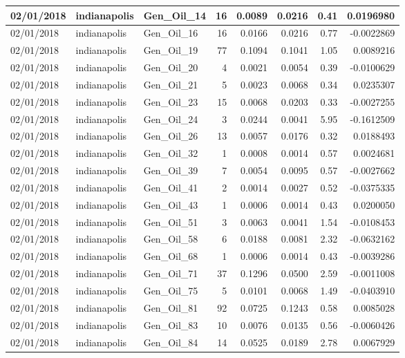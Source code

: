 \documentclass[
  letterpaper,
  DIV=11,
  numbers=noendperiod]{scrartcl}
\begin{document}
\begin{tabular}{l|l|l|r|r|r|r|r}
\hline
02/01/2018 & indianapolis & Gen\_Oil\_14 & 16 & 0.0089 & 0.0216 & 0.41 & 0.0196980\\
\hline
02/01/2018 & indianapolis & Gen\_Oil\_16 & 16 & 0.0166 & 0.0216 & 0.77 & -0.0022869\\
\hline
02/01/2018 & indianapolis & Gen\_Oil\_19 & 77 & 0.1094 & 0.1041 & 1.05 & 0.0089216\\
\hline
02/01/2018 & indianapolis & Gen\_Oil\_20 & 4 & 0.0021 & 0.0054 & 0.39 & -0.0100629\\
\hline
02/01/2018 & indianapolis & Gen\_Oil\_21 & 5 & 0.0023 & 0.0068 & 0.34 & 0.0235307\\
\hline
02/01/2018 & indianapolis & Gen\_Oil\_23 & 15 & 0.0068 & 0.0203 & 0.33 & -0.0027255\\
\hline
02/01/2018 & indianapolis & Gen\_Oil\_24 & 3 & 0.0244 & 0.0041 & 5.95 & -0.1612509\\
\hline
02/01/2018 & indianapolis & Gen\_Oil\_26 & 13 & 0.0057 & 0.0176 & 0.32 & 0.0188493\\
\hline
02/01/2018 & indianapolis & Gen\_Oil\_32 & 1 & 0.0008 & 0.0014 & 0.57 & 0.0024681\\
\hline
02/01/2018 & indianapolis & Gen\_Oil\_39 & 7 & 0.0054 & 0.0095 & 0.57 & -0.0027662\\
\hline
02/01/2018 & indianapolis & Gen\_Oil\_41 & 2 & 0.0014 & 0.0027 & 0.52 & -0.0375335\\
\hline
02/01/2018 & indianapolis & Gen\_Oil\_43 & 1 & 0.0006 & 0.0014 & 0.43 & 0.0200050\\
\hline
02/01/2018 & indianapolis & Gen\_Oil\_51 & 3 & 0.0063 & 0.0041 & 1.54 & -0.0108453\\
\hline
02/01/2018 & indianapolis & Gen\_Oil\_58 & 6 & 0.0188 & 0.0081 & 2.32 & -0.0632162\\
\hline
02/01/2018 & indianapolis & Gen\_Oil\_68 & 1 & 0.0006 & 0.0014 & 0.43 & -0.0039286\\
\hline
02/01/2018 & indianapolis & Gen\_Oil\_71 & 37 & 0.1296 & 0.0500 & 2.59 & -0.0011008\\
\hline
02/01/2018 & indianapolis & Gen\_Oil\_75 & 5 & 0.0101 & 0.0068 & 1.49 & -0.0403910\\
\hline
02/01/2018 & indianapolis & Gen\_Oil\_81 & 92 & 0.0725 & 0.1243 & 0.58 & 0.0085028\\
\hline
02/01/2018 & indianapolis & Gen\_Oil\_83 & 10 & 0.0076 & 0.0135 & 0.56 & -0.0060426\\
\hline
02/01/2018 & indianapolis & Gen\_Oil\_84 & 14 & 0.0525 & 0.0189 & 2.78 & 0.0067929\\

\end{tabular}
\end{document}
